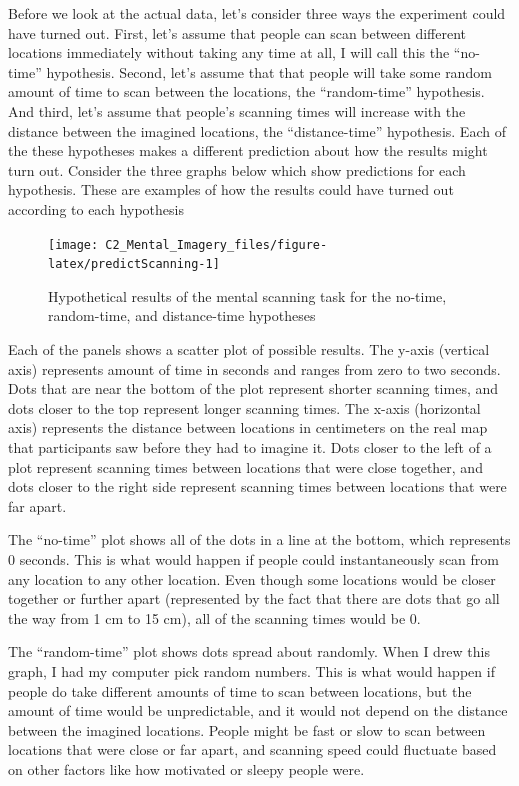 \documentclass[
  oneside,
  12pt]{crumpbook}
\begin{document}
Before we look at the actual data, let's consider three ways the experiment could have turned out. First, let's assume that people can scan between different locations immediately without taking any time at all, I will call this the ``no-time'' hypothesis. Second, let's assume that that people will take some random amount of time to scan between the locations, the ``random-time'' hypothesis. And third, let's assume that people's scanning times will increase with the distance between the imagined locations, the ``distance-time'' hypothesis. Each of the these hypotheses makes a different prediction about how the results might turn out. Consider the three graphs below which show predictions for each hypothesis. These are examples of how the results could have turned out according to each hypothesis

\begin{figure}
\texttt{[image: C2\_Mental\_Imagery\_files/figure-latex/predictScanning-1]} \caption{Hypothetical results of the mental scanning task for the no-time, random-time, and distance-time hypotheses}\label{fig:predictScanning}
\end{figure}

Each of the panels shows a scatter plot of possible results. The y-axis (vertical axis) represents amount of time in seconds and ranges from zero to two seconds. Dots that are near the bottom of the plot represent shorter scanning times, and dots closer to the top represent longer scanning times. The x-axis (horizontal axis) represents the distance between locations in centimeters on the real map that participants saw before they had to imagine it. Dots closer to the left of a plot represent scanning times between locations that were close together, and dots closer to the right side represent scanning times between locations that were far apart.

The ``no-time'' plot shows all of the dots in a line at the bottom, which represents 0 seconds. This is what would happen if people could instantaneously scan from any location to any other location. Even though some locations would be closer together or further apart (represented by the fact that there are dots that go all the way from 1 cm to 15 cm), all of the scanning times would be 0.

The ``random-time'' plot shows dots spread about randomly. When I drew this graph, I had my computer pick random numbers. This is what would happen if people do take different amounts of time to scan between locations, but the amount of time would be unpredictable, and it would not depend on the distance between the imagined locations. People might be fast or slow to scan between locations that were close or far apart, and scanning speed could fluctuate based on other factors like how motivated or sleepy people were.
\end{document}
